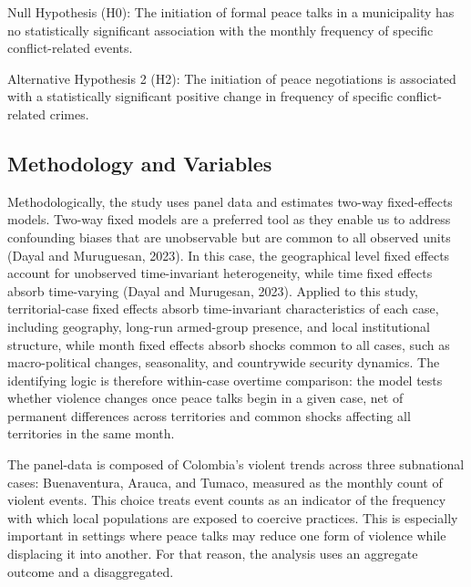 \documentclass[11pt]{article}
\begin{document}
Null Hypothesis (H0): 
The initiation of formal peace talks in a municipality has no statistically significant association with the monthly frequency of specific conflict-related events.

Alternative Hypothesis 2 (H2):
The initiation of peace negotiations is associated with a statistically significant positive change in frequency of specific conflict-related crimes.

\subsection{Methodology and Variables}\label{Methodology-variables}

Methodologically, the study uses panel data and estimates two-way fixed-effects models. Two-way fixed models are a preferred tool as they enable us to address confounding biases that are unobservable but are common to all observed units (Dayal and Muruguesan, 2023). In this case, the geographical level fixed effects account for unobserved time-invariant heterogeneity, while time fixed effects absorb time-varying (Dayal and Murugesan, 2023). Applied to this study, territorial-case fixed effects absorb time-invariant characteristics of each case, including geography, long-run armed-group presence, and local institutional structure, while month fixed effects absorb shocks common to all cases, such as macro-political changes, seasonality, and countrywide security dynamics. The identifying logic is therefore within-case overtime comparison: the model tests whether violence changes once peace talks begin in a given case, net of permanent differences across territories and common shocks affecting all territories in the same month.

The panel-data is composed of Colombia's violent trends across three subnational cases: Buenaventura, Arauca, and Tumaco, measured as the monthly count of violent events. This choice treats event counts as an indicator of the frequency with which local populations are exposed to coercive practices. This is especially important in settings where peace talks may reduce one form of violence while displacing it into another. For that reason, the analysis uses an aggregate outcome and a disaggregated.
\end{document}

